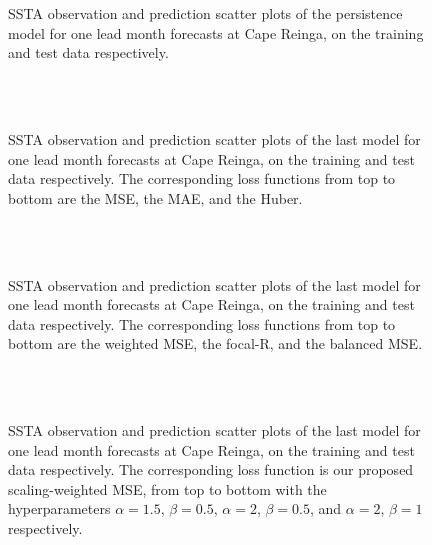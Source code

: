 \documentclass[11pt, a4paper]{article}
\begin{document}
\begin{figure}[H]
\centering
{}
\caption{SSTA observation and prediction scatter plots of the persistence model for one lead month forecasts at Cape Reinga, on the training and test data respectively.}
\end{figure}

\begin{figure}[H]
\centering
{}
\\
\\
\caption{SSTA observation and prediction scatter plots of the last model for one lead month forecasts at Cape Reinga, on the training and test data respectively. The corresponding loss functions from top to bottom are the MSE, the MAE, and the Huber.}
\end{figure}

\begin{figure}[H]
\centering
{}
\\
\\
\caption{SSTA observation and prediction scatter plots of the last model for one lead month forecasts at Cape Reinga, on the training and test data respectively. The corresponding loss functions from top to bottom are the weighted MSE, the focal-R, and the balanced MSE.}
\end{figure}

\begin{figure}[H]
\centering
{}
\\
\\
\caption{SSTA observation and prediction scatter plots of the last model for one lead month forecasts at Cape Reinga, on the training and test data respectively. The corresponding loss function is our proposed scaling-weighted MSE, from top to bottom with the hyperparameters $\alpha=1.5$, $\beta=0.5$, $\alpha=2$, $\beta=0.5$, and $\alpha=2$, $\beta=1$ respectively.}
\end{figure}
\end{document}
